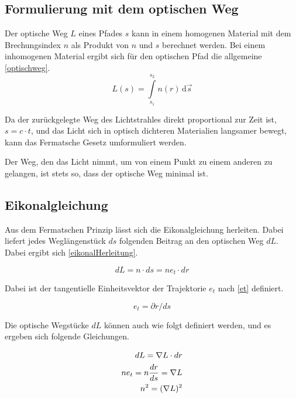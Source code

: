 \subsection{Formulierung mit dem optischen Weg}
Der optische Weg $L$  eines Pfades $s$ kann in einem homogenen Material 
mit dem Brechungsindex $n$ als Produkt von $n$ und $s$ berechnet werden.
Bei einem inhomogenen Material ergibt sich für den optischen Pfad die allgemeine \eqref{optischweg}.
\begin{equation}
	L(s) = \int\limits_{s_1}^{s_2} n(r) \,\mathrm d\vec s 
	\label{optischweg}
\end{equation}

Da der zurückgelegte Weg des Lichtstrahles direkt proportional zur Zeit ist, $s = c \cdot t$,
und das Licht sich in optisch dichteren Materialien langsamer bewegt,
kann das Fermatsche Gesetz umformuliert werden\cite{Definition}. 


\begin{definition}
Der Weg, den das Licht nimmt, um von einem Punkt zu einem anderen zu gelangen, ist stets so, dass der optische Weg minimal ist.
\end{definition}

\subsection{Eikonalgleichung}
Aus dem Fermatschen Prinzip lässt sich die Eikonalgleichung herleiten.
Dabei liefert jedes Weglängenstück $ds$ folgenden Beitrag an den optischen Weg $dL$. 
Dabei ergibt sich \eqref{eikonalHerleitung}.

\begin{equation}
	dL = n \cdot ds = n e_t \cdot dr
	\label{eikonalHerleitung}
\end{equation}

Dabei ist der tangentielle Einheitsvektor der Trajektorie $e_t$ nach  \eqref{et} definiert.

\begin{equation}
	e_t = \partial r / ds
	\label{et}
\end{equation}

Die optische Wegstücke $dL$ können auch wie folgt  definiert werden, 
und es ergeben sich folgende Gleichungen.

\begin{align}
	dL = \nabla L \cdot dr \notag \\
	n e_t = n \frac{dr}{ds} = \nabla L \notag \\
	n^2 = (\nabla L)^2 \label{eikongleichung}
\end{align}

